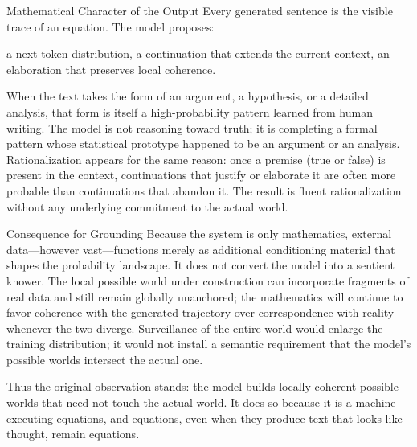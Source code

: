 Mathematical Character of the Output
Every generated sentence is the visible trace of an equation. The model proposes:

a next-token distribution,
a continuation that extends the current context,
an elaboration that preserves local coherence.

When the text takes the form of an argument, a hypothesis, or a detailed analysis, that form is itself a high-probability pattern learned from human writing. The model is not reasoning toward truth; it is completing a formal pattern whose statistical prototype happened to be an argument or an analysis. Rationalization appears for the same reason: once a premise (true or false) is present in the context, continuations that justify or elaborate it are often more probable than continuations that abandon it. The result is fluent rationalization without any underlying commitment to the actual world.

Consequence for Grounding
Because the system is only mathematics, external data—however vast—functions merely as additional conditioning material that shapes the probability landscape. It does not convert the model into a sentient knower. The local possible world under construction can incorporate fragments of real data and still remain globally unanchored; the mathematics will continue to favor coherence with the generated trajectory over correspondence with reality whenever the two diverge. Surveillance of the entire world would enlarge the training distribution; it would not install a semantic requirement that the model’s possible worlds intersect the actual one.

Thus the original observation stands: the model builds locally coherent possible worlds that need not touch the actual world. It does so because it is a machine executing equations, and equations, even when they produce text that looks like thought, remain equations.
